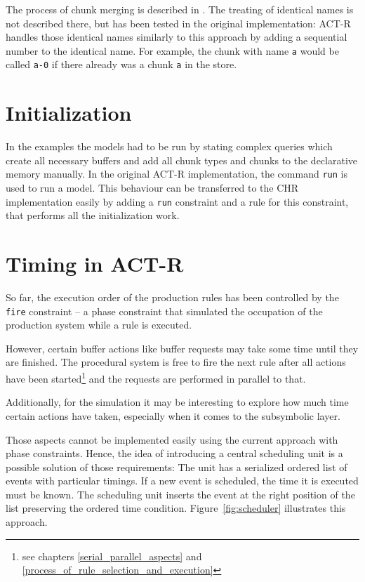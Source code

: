 The process of chunk merging is described in \cite[??]{actr_reference}. The treating of identical names is not described there, but has been tested in the original implementation: ACT-R handles those identical names similarly to this approach by adding a sequential number to the identical name. For example, the chunk with name \lstinline|a| would be called \lstinline|a-0| if there already was a chunk \lstinline|a| in the store.

\section{Initialization}
\label{initialization}

In the examples the models had to be run by stating complex queries which create all necessary buffers and add all chunk types and chunks to the declarative memory manually. In the original ACT-R implementation, the command \lstinline|run| is used to run a model. This behaviour can be transferred to the CHR implementation easily by adding a \lstinline|run| constraint and a rule for this constraint, that performs all the initialization work.


\section{Timing in ACT-R}

So far, the execution order of the production rules has been controlled by the \lstinline|fire| constraint -- a phase constraint that simulated the occupation of the production system while a rule is executed.

However, certain buffer actions like buffer requests may take some time until they are finished. The procedural system is free to fire the next rule after all actions have been started\footnote{see chapters \ref{serial_parallel_aspects} and \ref{process_of_rule_selection_and_execution}} and the requests are performed in parallel to that.

Additionally, for the simulation it may be interesting to explore how much time certain actions have taken, especially when it comes to the subsymbolic layer.

Those aspects cannot be implemented easily using the current approach with phase constraints. Hence, the idea of introducing a central scheduling unit is a possible solution of those requirements: The unit has a serialized ordered list of events with particular timings. If a new event is scheduled, the time it is executed must be known. The scheduling unit inserts the event at the right position of the list preserving the ordered time condition. Figure~\ref{fig:scheduler} illustrates this approach.

